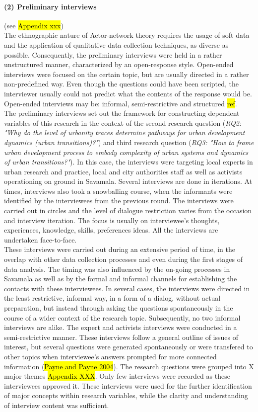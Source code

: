 \documentclass[11pt]{report}
\begin{document}
\paragraph{(2) Preliminary interviews} 
(see \hl{Appendix xxx})
\\
The ethnographic nature of Actor-network theory requires the usage of soft data and the application of qualitative data collection techniques, as diverse as possible. Consequently, the preliminary interviews were held in a rather unstructured manner, characterized by an open-response style. Open-ended interviews were focused on the certain topic, but are usually directed in a rather non-predefined way. Even though the questions could have been scripted, the interviewer usually could not predict what the contents of the response would be. Open-ended interviews may be: informal, semi-restrictive and structured \hl{ref}.
\\
The preliminary interviews set out the framework for constructing dependent variables of this research in the context of the second research question (\textit{RQ2: "Why do the level of urbanity traces determine pathways for urban development dynamics (urban transitions)?"}) and third research question (\textit{RQ3: "How to frame urban development process to embody complexity of urban systems and dynamics of urban transitions?"}). In this case, the interviews were targeting local experts in urban research and practice, local and city authorities staff as well as activists operationing on ground in Savamala. Several interviews are done in iterations. At times, interviews also took a snowballing course, when the informants were identified by the interviewees from the previous round. The interviews were carried out in circles and the level of dialogue restriction varies from the occasion and interview iteration. The focus is usually on interviewee's thoughts, experiences, knowledge, skills, preferences ideas. All the interviews are undertaken face-to-face.
\\
These interviews were carried out during an extensive period of time, in the overlap with other data collection processes and even during the first stages of data analysis. The timing was also influenced by the on-going processes in Savamala as well as by the formal and informal channels for establishing the contacts with these interviewees. In several cases, the interviews were directed in the least restrictive, informal way, in a form of a dialog, without actual preparation, but instead through asking the questions spontaneously in the course of a wider context of the research topic. Subsequently, no two informal interviews are alike. The expert and activists interviews were conducted in a semi-restrictive manner. These interviews follow a general outline of issues of interest, but several questions were generated spontaneously or were transfered to other topics when interviewee's answers prompted for more connected information (\hl{Payne and Payne 2004}). The research questions were grouped into X major themes \hl{Appendix XXX}. Only few interviews were recorded as these interviewees approved it. These interviews were used for the further identification of major concepts within research variables, while the clarity and understanding of interview content was sufficient. 
\end{document}
